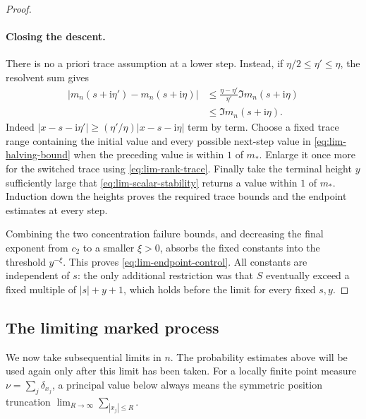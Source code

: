 \begin{proof}
\paragraph{Closing the descent.}
There is no a priori trace assumption at a lower step. Instead, if
\(\eta/2\le\eta'\le\eta\), the resolvent sum gives
\begin{equation}\label{eq:lim-halving-bound}
 \begin{split}
 |m_n(s+\mathrm i\eta')-m_n(s+\mathrm i\eta)|
 &\le \frac{\eta-\eta'}{\eta'}\Im m_n(s+\mathrm i\eta)\\
 &\le \Im m_n(s+\mathrm i\eta).
 \end{split}
\end{equation}
Indeed
\(|x-s-\mathrm i\eta'|\ge(\eta'/\eta)|x-s-\mathrm i\eta|\)
term by term. Choose a fixed trace range containing the initial value
and every possible next-step value in \eqref{eq:lim-halving-bound}
when the preceding value is within \(1\) of \(m_*\). Enlarge it once
more for the switched trace using \eqref{eq:lim-rank-trace}. Finally
take the terminal height \(y\) sufficiently large that
\eqref{eq:lim-scalar-stability} returns a value within \(1\) of \(m_*\).
Induction down the heights proves the required trace bounds and the
endpoint estimates at every step.

Combining the two concentration failure bounds, and decreasing the
final exponent from \(c_2\) to a smaller \(\xi>0\), absorbs the fixed
constants into the threshold \(y^{-\xi}\). This proves
\eqref{eq:lim-endpoint-control}. All constants are independent of \(s\):
the only additional restriction was that \(S\) eventually exceed a
fixed multiple of \(|s|+y+1\), which holds before the limit for every
fixed \(s,y\).
\end{proof}

\subsection{The limiting marked process}

We now take subsequential limits in \(n\). The probability estimates
above will be used again only after this limit has been taken. For a
locally finite point measure \(\nu=\sum_j\delta_{x_j}\), a principal
value below always means the symmetric position truncation
\(\lim_{R\to\infty}\sum_{|x_j|\le R}\).

